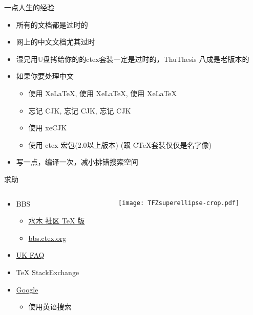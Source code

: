 \begin{frame}{一点人生的经验}
  \begin{itemize}
    \item 所有的文档都是过时的
    \item 网上的中文文档尤其过时
    \item 湿兄用U盘拷给你的的ctex套装一定是过时的，ThuThesis 八成是老版本的
    \item 如果你要处理中文
      \begin{itemize}
        \item 使用 XeLaTeX, 使用 XeLaTeX, 使用 XeLaTeX
        \item 忘记 CJK, 忘记 CJK, 忘记 CJK
        \item 使用 xeCJK
        \item 使用 ctex 宏包(2.0以上版本) (跟 C\TeX 套装仅仅是名字像)
      \end{itemize}
    \item 写一点，编译一次，减小排错搜索空间
  \end{itemize} 
\end{frame}

\begin{frame}{求助}
	\begin{columns}[c]
		\begin{column}{.45\textwidth}
			\begin{itemize}
				\item BBS
					\begin{itemize}
						\item \href{http://www.newsmth.net/nForum/board/TeX}{水木
							社区 TeX 版}
						\item \href{http://bbs.ctex.org/}{bbs.ctex.org}
					\end{itemize}
				\item \href{http://www.tex.ac.uk/cgi-bin/texfaq2html}{UK FAQ}
				\item TeX StackExchange
				\item \href{http://justfuckinggoogleit.com/}{Google}
          \begin{itemize}
            \item 使用英语搜索
          \end{itemize}
			\end{itemize}
		\end{column}
		\begin{column}{.45\textwidth}
			\texttt{[image: TFZsuperellipse-crop.pdf]}
		\end{column}
	\end{columns}
\end{frame}

